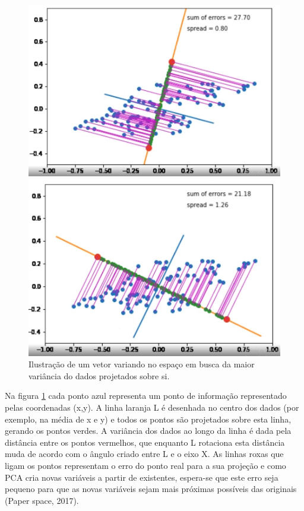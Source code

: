 \documentclass[12pt]{report}
\begin{document}
\begin{figure}
\begin{minipage}[b]{0.4\textwidth}
  \end{minipage}
    \hfill
  \begin{minipage}[b]{0.4\textwidth}
    \includegraphics[width=\textwidth]{images/3.png}
  \end{minipage}
    \hfill
  \begin{minipage}[b]{0.4\textwidth}
    \includegraphics[width=\textwidth]{images/5.png}
  \end{minipage}
  \caption{Ilustração de um vetor variando no espaço em busca da maior variância do dados projetados sobre si.}
  \label{fig:animacao_pca}
\end{figure}

Na figura \ref{fig:animacao_pca} cada ponto azul representa um ponto de informação representado pelas coordenadas (x,y). A linha laranja L é desenhada no centro dos dados (por exemplo, na média de x e y) e todos os pontos são projetados sobre esta linha, gerando os pontos verdes. A variância dos dados ao longo da linha é dada pela distância entre os pontos vermelhos, que enquanto L rotaciona esta distância muda de acordo com o ângulo criado entre L e o eixo X. As linhas roxas que ligam os pontos representam o erro do ponto real para a sua projeção e como PCA cria novas variáveis a partir de existentes, espera-se que este erro seja pequeno para que as novas variáveis sejam mais próximas possíveis das originais (Paper space, 2017).
\end{document}
